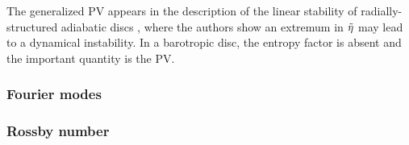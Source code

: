 The generalized PV appears in the description of the linear stability
of radially-structured adiabatic discs \citep{lovelace99,li00}, where
the authors show an extremum in $\tilde{\eta}$ may lead to a dynamical
instability. In a barotropic disc, the entropy factor is absent
and the important quantity is the PV. 

\subsubsection{Fourier modes}

\subsubsection{Rossby number}



